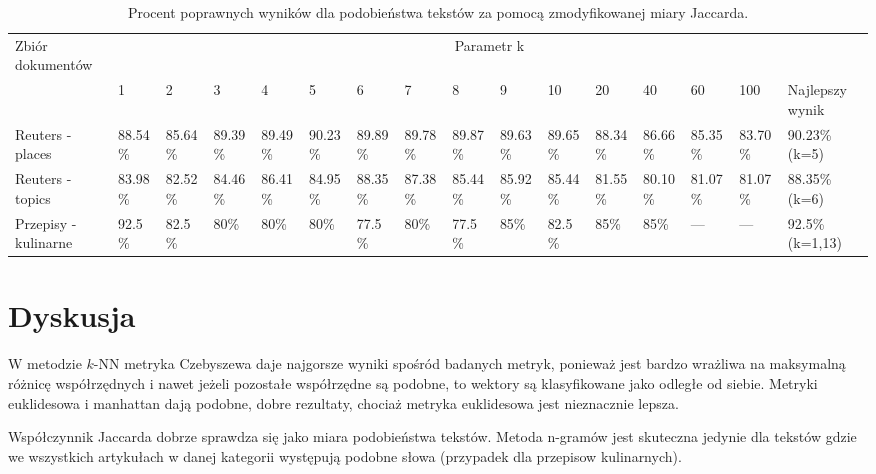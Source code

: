 \documentclass{classrep}
\begin{document}
\begingroup
{\scriptsize  
\setlength{\LTleft}{-20cm plus -1fill}
\setlength{\LTright}{\LTleft}

\begin{longtable}{|p{1cm}|p{0.7cm}|p{0.7cm}|p{0.7cm}|p{0.7cm}|p{0.7cm}|p{0.7cm}|p{0.7cm}|p{0.7cm}|p{0.7cm}|p{0.7cm}|p{0.7cm}|p{0.7cm}|p{0.7cm}|p{0.7cm}|p{1.1cm}|}
\caption{ Procent poprawnych wyników dla podobieństwa tekstów za pomocą zmodyfikowanej miary Jaccarda.}\\ 
\hline

Zbiór
dokumentów

 &\multicolumn{15}{c|}{Parametr k}\\
\cline{2-16}
& 1
& 2
& 3
& 4
& 5
& 6
& 7
& 8
& 9
& 10
& 20
& 40
& 60
& 100
& Najlepszy wynik
\\ \hline\hline
Reuters
- places
& 88.54\%	%
& 85.64\%	%
& 89.39\%	%
& 89.49\%	%
& 90.23\%	%
& 89.89\%	%
& 89.78\%	%
& 89.87\%	%
& 89.63\%	%
& 89.65\%	%
& 88.34\%	%
& 86.66\%	%
& 85.35\%	%
& 83.70\%	%

& 90.23\%	(k=5)
\\ \hline
Reuters
- topics
& 83.98\%	%
& 82.52\%	%
& 84.46\%	%
& 86.41\%	%
& 84.95\%	%
& 88.35\%	%
& 87.38\%	%
& 85.44\%	%
& 85.92\%	%
& 85.44\%	%
& 81.55\%	%
& 80.10\%	%
& 81.07\%	%
& 81.07\%	%

& 88.35\%	(k=6)
\\ \hline
Przepisy
- kulinarne 
& 92.5\%	%
& 82.5\%	%
& 80\%		%
& 80\%		%
& 80\%		%
& 77.5\%	%
& 80\%		%
& 77.5\%	%
& 85\%		%
& 82.5\%	%
& 85\%		%
& 85\%		%
& ---		%
& ---		%
& 92.5\% (k=1,13)
\\ \hline
\end{longtable}
}
\endgroup


\section{Dyskusja}
W metodzie $k$-NN metryka Czebyszewa daje najgorsze wyniki spośród badanych metryk, ponieważ jest bardzo wrażliwa na maksymalną różnicę współrzędnych i nawet jeżeli pozostałe współrzędne są podobne, to wektory są klasyfikowane jako odległe od siebie. Metryki euklidesowa i manhattan dają podobne, dobre rezultaty, chociaż metryka euklidesowa jest nieznacznie lepsza.

Współczynnik Jaccarda dobrze sprawdza się jako miara podobieństwa tekstów. Metoda n-gramów jest skuteczna jedynie dla tekstów gdzie we wszystkich artykułach w danej kategorii występują podobne słowa (przypadek dla przepisow kulinarnych).
\end{document}
